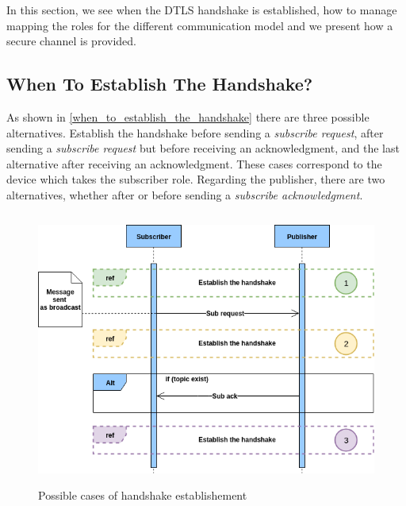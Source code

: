 In this section, we see when the DTLS handshake is established, how to manage
mapping the roles for the different communication model and we present how a secure channel
is provided.

\subsection{When To Establish The Handshake?}


As shown in \autoref{when_to_establish_the_handshake}
there are three possible alternatives. Establish the handshake before sending a \textit{subscribe request}, after sending
a \textit{subscribe request} but before receiving an acknowledgment, and the last alternative after receiving an
acknowledgment. These cases correspond to the device which takes the subscriber role. Regarding
the publisher, there are two alternatives, whether after or before sending a \textit{subscribe acknowledgment}.

\begin{figure}[!htbp]
\centering
\includegraphics[width=12cm,height=9cm]{figures/design/when_to_establish_the_handshake.png}
\caption{Possible cases of handshake establishement}\label{when_to_establish_the_handshake}
\end{figure}

